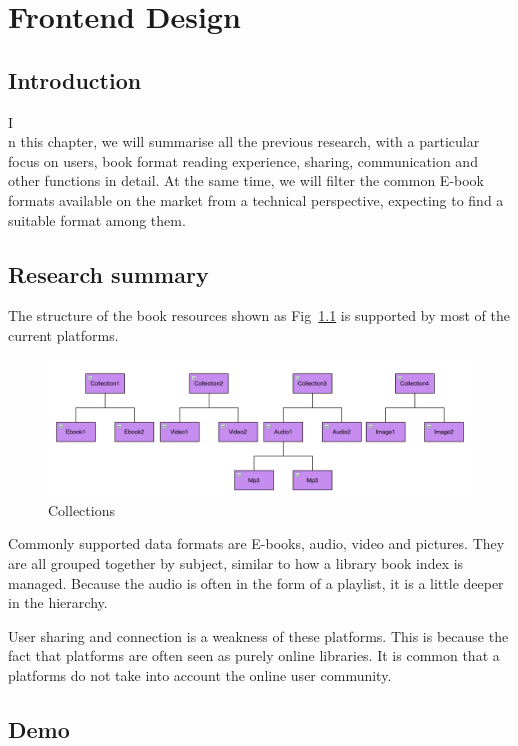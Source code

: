 \chapter{Frontend Design}

\section{Introduction}
\lettrine[lines=2]{I}\\n this chapter, we will summarise all the previous research, with a particular focus on users, book format reading experience, sharing, communication and other functions in detail. 
At the same time, we will filter the common E-book formats available on the market from a technical perspective, expecting to find a suitable format among them.

\section{Research summary}

The structure of the book resources shown as Fig~\ref{fig30} is supported by most of the current platforms. 

\begin{figure}[htbp]
  \centerline{\includegraphics[width=500pt]{images/collections.png}}
  \caption{Collections}
  \label{fig30}
\end{figure}

Commonly supported data formats are E-books, audio, video and pictures. 
They are all grouped together by subject, similar to how a library book index is managed. 
Because the audio is often in the form of a playlist, it is a little deeper in the hierarchy. 

User sharing and connection is a weakness of these platforms.
This is because the fact that platforms are often seen as purely online libraries.
It is common that a platforms do not take into account the online user community.

\section{Demo}

